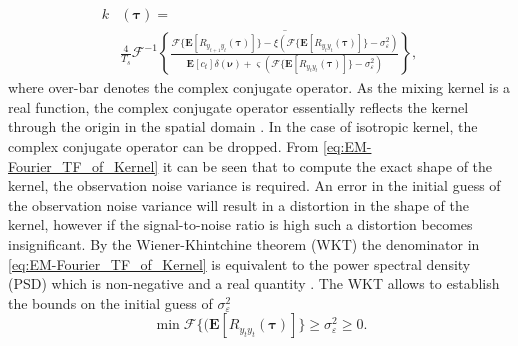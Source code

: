 \documentclass[10pt,twocolumn,twoside]{IEEEtran}
\begin{document}
\begin{align}\label{eq:EM-Fourier_TF_of_Kernel}   
	k&(\boldsymbol\tau) = \nonumber \\
	&\frac{4}{T_s}\mathcal{F}^{-1}\overline{\left\{ \frac{\mathcal{F}\{\mathbf{E}[R_{y_{t+1}y_t}(\boldsymbol{\tau})]\} - \xi\left(\mathcal{F}\{\mathbf{E}[ R_{y_ty_t}(\boldsymbol{\tau})]\} - \sigma_{\varepsilon}^2 \right)} {\mathbf{E}\left[c_t\right]\delta(\boldsymbol{\nu}) + \varsigma (\mathcal{F}\{\mathbf{E}\left[R_{y_ty_t}(\boldsymbol\tau)\right]\} - \sigma_{\varepsilon}^2 )} \right\}},
\end{align}
where over-bar denotes the complex conjugate operator. As the mixing kernel is a real function, the complex conjugate operator essentially reflects the kernel through the origin in the spatial domain \cite{Bracewell2000}. In the case of isotropic kernel, the complex conjugate operator can be dropped.  From \eqref{eq:EM-Fourier_TF_of_Kernel} it can be seen that to compute the exact shape of the kernel, the observation noise variance is required. An error in the initial guess of  the observation noise variance will result in a distortion in the shape of the kernel, however if the signal-to-noise ratio is high such a distortion becomes insignificant.
By the Wiener-Khintchine theorem (WKT) the denominator in \eqref{eq:EM-Fourier_TF_of_Kernel} is equivalent to the power spectral density (PSD) which is non-negative and a real quantity \cite{Ricker2003}. The WKT allows to establish the bounds on the initial guess of $\sigma_{\varepsilon}^2$
\begin{equation}\label{eq:BoundOnObsVariance}   
  \min\mathcal{F}\{(\mathbf{E}\left[R_{y_ty_t}(\boldsymbol\tau)\right]\}\ge\sigma_{\varepsilon}^2\ge0. 
\end{equation}
\end{document}
